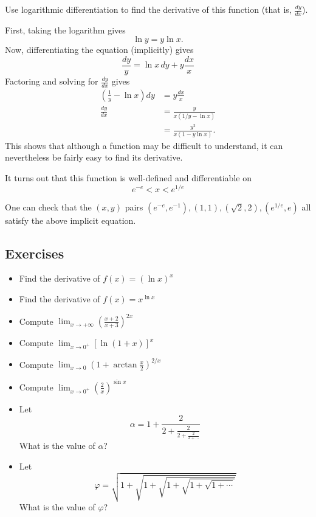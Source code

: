 \documentclass[twoside,openright,titlepage,a4paper]{book}
\begin{document}
\begin{sloppypar}
Use logarithmic differentiation to find the derivative of this function (that is, $\frac{dy}{dx}$).

\begin{examplebox}
First, taking the logarithm gives \[ \ln y = y \ln x. \]
Now, differentiating the equation (implicitly) gives \[ \frac{dy}{y} = \ln x \, dy + y \frac{dx}{x} \]
Factoring and solving for $\frac{dy}{dx}$ gives
\begin{align*}
\left(\frac{1}{y} - \ln x\right)dy &= y \frac{dx}{x} \\
\frac{dy}{dx} &= \frac{y}{x \left(1/y-\ln x\right)} \\
&= \frac{y^2}{x (1- y \ln x)}. 
\end{align*}
This shows that although a function may be difficult to understand, it can nevertheless be fairly easy to find its derivative.	
\end{examplebox}

It turns out that this function is well-defined and differentiable on \[ e^{-e} < x < e^{1/e} \]

One can check that the $(x,y)$ pairs $(e^{-e},e^{-1}),(1,1),(\sqrt{2},2),(e^{1/e},e)$ all satisfy the above implicit equation.
	
\subsection{Exercises}		
		
\begin{itemize}
\item Find the derivative of $f(x) = (\ln x)^x$
\item Find the derivative of $f(x) = x^{\ln x}$
\item Compute $ \displaystyle \lim_{x \to +\infty} \left( \frac{x+2}{x+3} \right)^{2x} $
\item Compute $ \displaystyle \lim_{x \to 0^+} \left[ \ln(1+x) \right]^{x} $
\item Compute $ \displaystyle \lim_{x \to 0} \left(1 + \arctan\frac{x}{2} \right)^{2/x} $
\item Compute $ \displaystyle \lim_{x \to 0^+} \left(\frac{2}{x}\right)^{\sin x} $
\item Let \[ \alpha =1 + \frac{2}{2+ \frac{2}{2+ \frac{2}{2+\cdots}}} \] What is the value of $\alpha$?
\item Let \[ \varphi = \sqrt{1+\sqrt{1+\sqrt{1+\sqrt{1+\sqrt{1+\cdots}}}}}\] What is the value of $\varphi$?
\end{itemize}


\end{sloppypar}
\end{document}
